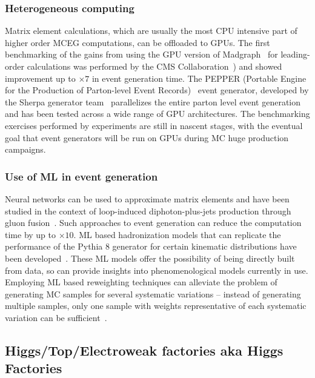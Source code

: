 \documentclass[10pt,a4paper]{article}
\begin{document}
\subsubsection{Heterogeneous computing}\label{heterogeneous-computing}

Matrix element calculations, which are usually the most CPU intensive part of
higher order MCEG computations, can be offloaded to GPUs. The first benchmarking
of the gains from using the GPU version of
Madgraph~\cite{Alwall:2014hca,MadgraphOnGPU} for leading-order calculations was
performed by the CMS Collaboration~\cite{CMS-DP-2024-086}) and showed
improvement up to $\times 7$ in event generation time. The PEPPER (Portable
Engine for the Production of Parton-level Event Records)~\cite{Bothmann:2023gew}
event generator, developed by the Sherpa generator team~\cite{Sherpa:2019gpd}
parallelizes the entire parton level event generation and has been tested across
a wide range of GPU architectures. The benchmarking exercises performed by
experiments are still in nascent stages, with the eventual goal that event
generators will be run on GPUs during MC huge production campaigns.

\subsubsection{Use of ML in event generation}
\label{use-of-ml-in-event-generation}

Neural networks can be used to approximate matrix elements and have been studied
in the context of loop-induced diphoton-plus-jets production through gluon
fusion~\cite{Moodie:2022flt}. Such approaches to event generation can reduce the
computation time by up to $\times 10$. ML based hadronization models that can
replicate the performance of the Pythia 8 generator for certain kinematic
distributions have been developed~\cite{Ilten:2022jfm, Bierlich:2023fmh}. These
ML models offer the possibility of being directly built from data, so can
provide insights into phenomenological models currently in use. Employing ML
based reweighting techniques can alleviate the problem of generating MC samples
for several systematic variations -- instead of generating multiple samples,
only one sample with weights representative of each systematic variation can be
sufficient~\cite{CMS:2024jdl}.

\subsection{Higgs/Top/Electroweak factories aka Higgs
Factories}\label{higgstopelectroweak-factories-aka-higgs-factories}
\end{document}
